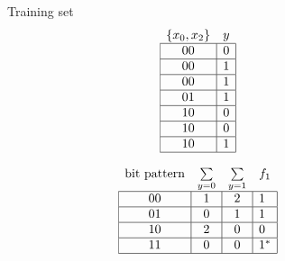 \begin{figure}[!htb]
\begin{minipage}{.95\linewidth}\centering
  \begin{minipage}[b]{.19\linewidth}\centering
    Training set
    \vspace{-0.5em}
    \begin{align*}
      \begin{array}{cc}
        \{x_0,x_2\}                    & y                      \\ \hline
        \multicolumn{1}{|c|}{00} & \multicolumn{1}{c|}{0} \\ \hline
        \multicolumn{1}{|c|}{00} & \multicolumn{1}{c|}{1} \\ \hline
        \multicolumn{1}{|c|}{00} & \multicolumn{1}{c|}{1} \\ \hline
        \multicolumn{1}{|c|}{01} & \multicolumn{1}{c|}{1} \\ \hline
        \multicolumn{1}{|c|}{10} & \multicolumn{1}{c|}{0} \\ \hline
        \multicolumn{1}{|c|}{10} & \multicolumn{1}{c|}{0} \\ \hline
        \multicolumn{1}{|c|}{10} & \multicolumn{1}{c|}{1} \\ \hline
      \end{array}
    \end{align*}
  \end{minipage}
  \begin{minipage}[b]{.4\linewidth}\centering
    \begin{align*}
      \begin{array}{cccc}
          \text{bit pattern}        & \sum\limits_{y=0}      & \multicolumn{1}{l}{\sum\limits_{y=1}} & f_1  \\ \hline
        \multicolumn{1}{|c|}{00} & \multicolumn{1}{c|}{1} & \multicolumn{1}{c|}{2} & \multicolumn{1}{l|}{1} \\ \hline
        \multicolumn{1}{|c|}{01} & \multicolumn{1}{c|}{0} & \multicolumn{1}{c|}{1} & \multicolumn{1}{l|}{1} \\ \hline
        \multicolumn{1}{|c|}{10} & \multicolumn{1}{c|}{2} & \multicolumn{1}{c|}{0} & \multicolumn{1}{l|}{0} \\ \hline
        \multicolumn{1}{|c|}{11} & \multicolumn{1}{c|}{0} & \multicolumn{1}{c|}{0} & \multicolumn{1}{l|}{1^*} \\ \hline
      \end{array}
    \end{align*}
  \end{minipage}
  \begin{minipage}[b]{.21\linewidth}\centering

\end{minipage}
\end{minipage}
\end{figure}
